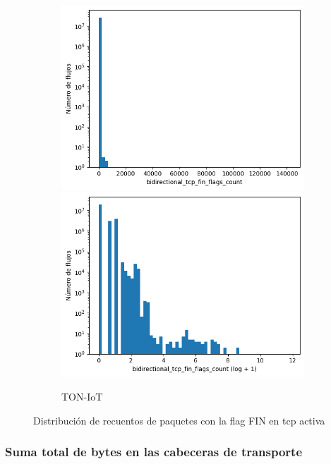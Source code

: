 \begin{figure}[H]
\begin{subfigure}[b]{0.32\textwidth}
        \includegraphics[width=\linewidth]{media/packet_pincer_toniot/bidirectional_tcp_fin_flags_count_linear_x_log_y.png}
        \includegraphics[width=\linewidth]{media/packet_pincer_toniot/bidirectional_tcp_fin_flags_count_log_x_log_y.png}
        \caption{TON-IoT}
    \end{subfigure}
       \caption{Distribución de recuentos de paquetes con la flag FIN en \acrshort{tcp} activa}
       \label{fig:packet_pincer_bidirectional_tcp_fin_flags_count}
\end{figure}

\subsubsection{Suma total de bytes en las cabeceras de transporte}

